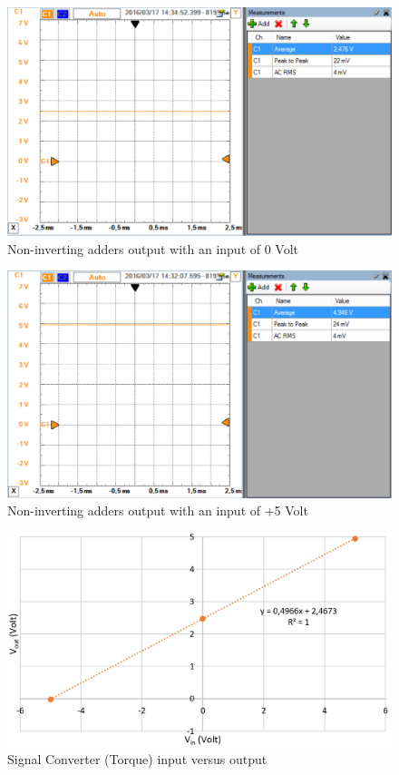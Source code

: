 \begin{figure}[H]
	\centering
	\includegraphics[width=0.9\linewidth]{Hardware/SignalConverter/Torque_test2}
	\caption{Non-inverting adders output with an input of 0 Volt}
	\label{fig:TorqueTest2}
\end{figure}

\begin{figure}[H]
	\centering
	\includegraphics[width=0.9\linewidth]{Hardware/SignalConverter/Torque_test3}
	\caption{Non-inverting adders output with an input of +5 Volt}
	\label{fig:TorqueTest3}
\end{figure}

\begin{figure}[H]
	\centering
	\includegraphics[width=0.8\linewidth]{Hardware/SignalConverter/TorqueTestGraph}
	\caption{Signal Converter (Torque) input versus output}
	\label{fig:TorqueTest4}
\end{figure}

